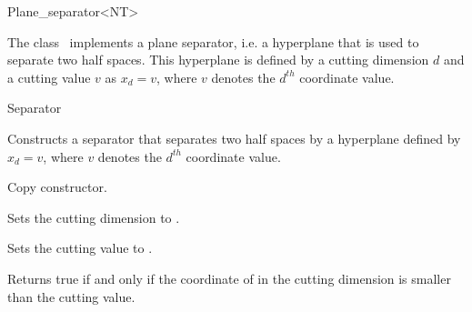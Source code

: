 

\begin{ccRefClass}{Plane_separator<NT>}  %


\ccDefinition
  
The class \ccRefName\ implements a plane separator, i.e. a hyperplane that is used to separate two half spaces.
This hyperplane is defined by a cutting dimension $d$ and a cutting value $v$
as $x_d=v$, where $v$ denotes the $d^{th}$ coordinate value.


\ccIsModel

Separator

\ccCreation
{}  %



{Constructs a separator that separates two half spaces by a hyperplane
defined by $x_d=v$, where $v$ denotes the $d^{th}$ coordinate value.}

{Copy constructor.}

\ccOperations

{Sets the cutting dimension to . }

{Sets the cutting value to . }



{Returns true if and only if the coordinate of  in the cutting dimension is smaller than the cutting value.}


\end{ccRefClass}
